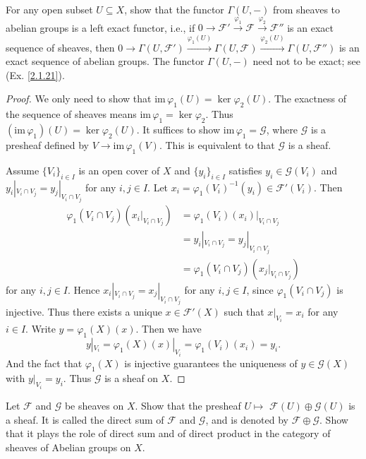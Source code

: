 \begin{exe}
	\label{2.1.8}
	For any open subset $U\subseteq X$, show that the functor $\Gamma(U,-)$ from sheaves to abelian groups is a left exact functor, i.e., if $0{\longrightarrow}\mathscr{F}'\xrightarrow{\varphi_1}\mathscr{F}\xrightarrow{\varphi_2}\mathscr{F}''$ is an exact sequence of sheaves, then $0{\longrightarrow}\Gamma(U,\mathscr{F}')\xrightarrow{\varphi_1(U)}{}\Gamma(U,\mathscr{F})\xrightarrow{\varphi_2(U)}{}\Gamma(U,\mathscr{F}'')$ is an exact sequence of abelian groups. The functor $\Gamma(U,-)$ need not to be exact; see \textup{(Ex. \ref{2.1.21})}.
\end{exe}

\begin{proof}
	We only need to show that $\mathrm{im}\,\varphi_1(U)=\ker\varphi_2(U)$. The exactness of the sequence of sheaves means $\mathrm{im}\,\varphi_1=\ker\varphi_2$. Thus $(\mathrm{im}\,\varphi_1)(U)=\ker\varphi_2(U)$. It suffices to show $\mathrm{im}\,\varphi_1=\mathscr{G}$, where $\mathscr{G}$ is a presheaf defined by $V\to\mathrm{im}\,\varphi_1(V)$. This is equivalent to that $\mathscr{G}$ is a sheaf.
	
	Assume $\{V_i\}_{i\in I}$ is an open cover of $X$ and $\{y_i\}_{i\in I}$ satisfies $y_i\in\mathscr{G}(V_i)$ and $y_i|_{V_i\cap V_j}=y_j|_{V_i\cap V_j}$ for any $i,j\in I$. Let $x_i=\varphi_1(V_i)^{-1}(y_i)\in\mathscr{F}'(V_i)$. Then 
	\begin{align*}
		\varphi_1(V_i\cap V_j)(x_i|_{V_i\cap V_j})&=\varphi_1(V_i)(x_i)|_{V_i\cap V_j}\\
		&=y_i|_{V_i\cap V_j}=y_j|_{V_i\cap V_j}\\
		&=\varphi_1(V_i\cap V_j)(x_j|_{V_i\cap V_j})
	\end{align*}
	for any $i,j\in I$. Hence $x_i|_{V_i\cap V_j}=x_j|_{V_i\cap V_j}$ for any $i,j\in I$, since $\varphi_1(V_i\cap V_j)$ is injective. Thus there exists a unique $x\in\mathscr{F}'(X)$ such that $x|_{V_i}=x_i$ for any $i\in I$. Write $y=\varphi_1(X)(x)$. Then we have $$y|_{V_i}=\varphi_1(X)(x)|_{V_i}=\varphi_1(V_i)(x_i)=y_i.$$ And the fact that $\varphi_1(X)$ is injective guarantees the uniqueness of $y\in\mathscr{G}(X)$ with $y|_{V_i}=y_i$. Thus $\mathscr{G}$ is a sheaf on $X$.
\end{proof}
\begin{exe}
	\label{2.1.9}
	Let $\mathscr{F}$ and $\mathscr{G}$ be sheaves on $X$. Show that the presheaf $U \mapsto$ $\mathscr{F}(U) \oplus \mathscr{G}(U)$ is a sheaf. It is called the direct sum of $\mathscr{F}$ and $\mathscr{G}$, and is denoted by $\mathscr{F} \oplus \mathscr{G} .$ Show that it plays the role of direct sum and of direct product in the category of sheaves of Abelian groups on $X$.
\end{exe}


